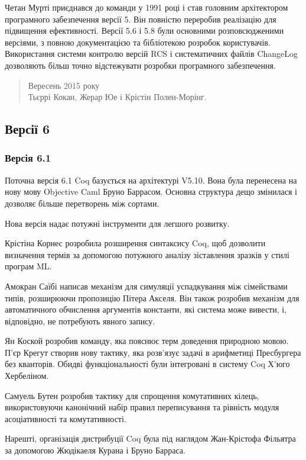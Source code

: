 \documentclass{article}
\begin{document}
Четан Мурті приєднався до команди у 1991 році і став головним архітектором програмного забезпечення версії 5. Він повністю переробив реалізацію для підвищення ефективності. Версії 5.6 і 5.8 були основними розповсюдженими версіями, з повною документацією та бібліотекою розробок користувачів. Використання системи контролю версій RCS і систематичних файлів ChangeLog дозволяють більш точно відстежувати розробки програмного забезпечення.

\begin{quote}
Вересень 2015 року \\
Тьєррі Кокан, Жерар Юе і Крістін Полен-Морінг.
\end{quote}

\subsection{Версії 6}

\subsubsection{Версія 6.1}

Поточна версія 6.1 Coq базується на архітектурі V5.10. Вона була перенесена на нову мову Objective Caml Бруно Баррасом. Основна структура дещо змінилася і дозволяє більше перетворень між сортами.

Нова версія надає потужні інструменти для легшого розвитку.

Крістіна Корнес розробила розширення синтаксису Coq, щоб дозволити визначення термів за допомогою потужного аналізу зіставлення зразків у стилі програм ML.

Амокран Саїбі написав механізм для симуляції успадкування між сімействами типів, розширюючи пропозицію Пітера Акселя. Він також розробив механізм для автоматичного обчислення аргументів константи, які система може вивести, і, відповідно, не потребують явного запису.

Ян Коской розробив команду, яка пояснює терм доведення природною мовою. П’єр Крегут створив нову тактику, яка розв’язує задачі в арифметиці Пресбургера без кванторів. Обидві функціональності були інтегровані в систему Coq Х’юго Хербеліном.

Самуель Бутен розробив тактику для спрощення комутативних кілець, використовуючи канонічний набір правил переписування та рівність модуля асоціативності та комутативності.

Нарешті, організація дистрибуції Coq була під наглядом Жан-Крістофа Фільятра за допомогою Жюдікаеля Курана і Бруно Барраса.
\end{document}
